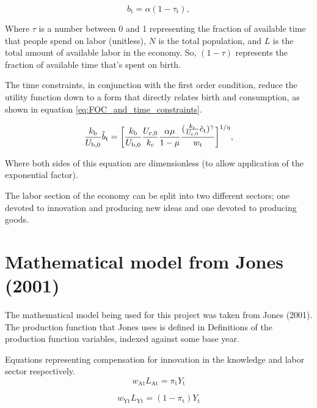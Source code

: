 \documentclass[letterpaper,12pt]{article}
\begin{document}
\begin{equation} \label{eq:birth_constraint}
b_\mathrm{t} = \alpha (1-\tau_\mathrm{t}),
\end{equation}

Where $\tau$ is a number between 0 and 1 representing the fraction of available time that people spend on labor (unitless), $N$ is the total population, and $L$ is the total amount of available labor in the economy. So, $(1-\tau)$ represents the fraction of available time that's spent on birth.

The time constraints, in conjunction with the first order condition, reduce the utility function down to a form that directly relates birth and consumption, as shown in equation \ref{eq:FOC_and_time_constraints}.

\begin{equation} \label{eq:FOC_and_time_constraints}
\frac{k_\mathrm{b}}{U_\mathrm{b,0}} \tilde b_\mathrm{t} = \bigg{[} \frac{k_\mathrm{b}}{U_\mathrm{b,0}} \frac{U_\mathrm{c,0}}{k_\mathrm{c}} \frac{\alpha \mu}{1-\mu} \frac{( \frac{k_\mathrm{c}}{U_\mathrm{c,0}} \tilde c_\mathrm{t} )^\gamma}{w_\mathrm{t}}\bigg{]}^{1/\eta} ,
\end{equation}

Where both sides of this equation are dimensionless (to allow application of the exponential factor).

The labor section of the economy can be split into two different sectors; one devoted to innovation and producing new ideas and one devoted to producing goods.


\section{Mathematical model from Jones (2001)}

The mathematical model being used for this project was taken from Jones (2001). The production function that Jones uses is defined in 
Definitions of the production function variables, indexed against some base year.

Equations representing compensation for innovation in the knowledge and labor sector respectively.
\begin{equation}
w_\mathrm{At} L_\mathrm{At} = \pi_\mathrm{t} Y_\mathrm{t}
\end{equation}

\begin{equation}
w_\mathrm{Yt} L_\mathrm{Yt} = (1-\pi_\mathrm{t})Y_\mathrm{t}
\end{equation}
\end{document}
